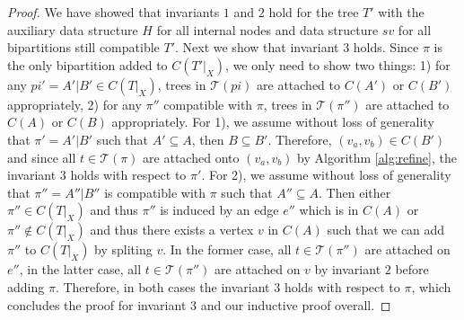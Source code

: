 \documentclass{bmcart}
\begin{document}
\begin{proof}
    We have showed that invariants $1$ and $2$ hold for the tree $T'$ with the auxiliary data structure $H$ for all internal nodes and data structure $sv$ for all bipartitions still compatible $T'$. Next we show that invariant $3$ holds. Since $\pi$ is the only bipartition added to $C(T'|_X)$, we only need to show two things: 1) for any $pi'=A'|B' \in C(T|_X)$, trees in $\mathcal{T}(pi)$ are attached to $C(A')$ or $C(B')$ appropriately, 2) for any $\pi''$ compatible with $\pi$, trees in $\mathcal{T}(\pi'')$ are attached to $C(A)$ or $C(B)$ appropriately. For 1), we assume without loss of generality that $\pi' = A'|B'$ such that $A' \subseteq A$, then $B \subseteq B'$. Therefore, $(v_a,v_b) \in C(B')$ and since all $t \in \mathcal{T}(\pi)$ are attached onto $(v_a,v_b)$ by Algorithm \ref{alg:refine}, the invariant $3$ holds with respect to $\pi'$. For 2), we assume without loss of generality that $\pi'' = A''|B''$ is compatible with $\pi$ such that $A'' \subseteq A$. Then either $\pi'' \in C(T|_X)$ and thus $\pi''$ is induced by an edge $e''$ which is in $C(A)$ or $\pi'' \notin C(T|_X)$ and thus there exists a vertex $v$ in $C(A)$ such that we can add $\pi''$ to $C(T|_X)$ by spliting $v$. In the former case, all $t \in \mathcal{T}(\pi'')$ are attached on $e''$, in the latter case, all $t \in \mathcal{T}(\pi'')$ are attached on $v$ by invariant $2$ before adding $\pi$. Therefore, in both cases the invariant $3$ holds with respect to $\pi$, which concludes the proof for invariant $3$ and our inductive proof overall.
\end{proof}
\end{document}
